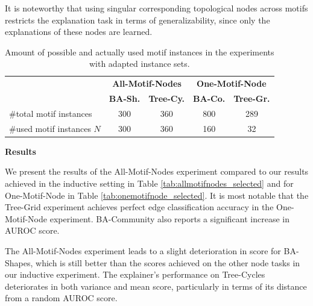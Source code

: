 It is noteworthy that using singular corresponding topological nodes across motifs restricts the explanation task in terms of generalizability, since only the explanations of these nodes are learned. %


\begin{table}[h]
    \centering
    \scriptsize
    \begin{tabular}{l|cc|cc}
    \textbf{} & \multicolumn{2}{c|}{\textbf{All-Motif-Nodes}} & \multicolumn{2}{c}{\textbf{One-Motif-Node}} \\
    \addlinespace
    \toprule
    \textbf{} & \textbf{BA-Sh.} & \textbf{Tree-Cy.} & \textbf{BA-Co.} & \textbf{Tree-Gr.} \\
    \midrule
    \#total motif instances & 300 & 360 & 800 & 289 \\
    \#used motif instances $N$ & 300 & 360 & 160  & 32 \\
    \end{tabular}
    \caption[Statistics of adapted Motif Node Instance]{Amount of possible and actually used motif instances in the experiments with adapted instance sets.}
    \label{tab:motif-statistics-exp}
\end{table}

\textbf{Results}\par
We present the results of the All-Motif-Nodes experiment compared to our results achieved in the inductive setting in Table \ref{tab:allmotifnodes_selected} and for One-Motif-Node in Table \ref{tab:onemotifnode_selected}. It is most notable that the Tree-Grid experiment achieves perfect edge classification accuracy in the One-Motif-Node experiment. BA-Community also reports a significant increase in AUROC score.

The All-Motif-Nodes experiment leads to a slight deterioration in score for BA-Shapes, which is still better than the scores achieved on the other node tasks in our inductive experiment. The explainer's performance on Tree-Cycles deteriorates in both variance and mean score, particularly in terms of its distance from a random AUROC score.


